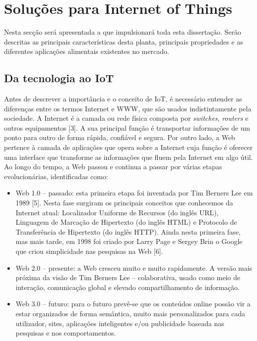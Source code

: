 
\chapter{Soluções para Internet of Things}

Nesta secção será apresentada a \sr que impulsionará toda esta dissertação. Serão descritas as principais características desta planta, principais propriedades e as diferentes aplicações alimentais existentes no mercado. 

	

\section{Da tecnologia ao IoT}


Antes de descrever a importância e o conceito de \ac{IoT}, é necessário entender as diferenças entre os termos Internet e \ac{WWW}, que são usados indistintamente pela sociedade. A Internet é a camada ou rede física composta por \textit{switches}, \textit{routers} e outros equipamentos [3]. A sua principal função é transportar informações de um ponto para outro de forma rápida, confiável e segura. Por outro lado, a Web pertence à camada de aplicações que opera sobre a Internet cuja função é oferecer uma interface que transforme as informações que fluem pela Internet em algo útil. Ao longo do tempo, a Web passou e continua a passar por várias etapas evolucionárias, identificadas como:

\begin{itemize}
	\item Web 1.0 – passado: esta primeira etapa foi inventada por Tim Berners Lee em 1989 [5]. Nesta fase surgiram os principais conceitos que conhecemos da Internet atual: Localizador Uniforme de Recursos (do inglês \ac{URL}), Linguagem de Marcação de Hipertexto (do inglês \ac{HTML}) e Protocolo de Transferência de Hipertexto (do inglês \ac{HTTP}). Ainda nesta primeira fase, mas mais tarde, em 1998 foi criado por Larry Page e Sergey Brin o Google que criou simplicidade nas pesquisas na Web [6]. 
	
	\item Web 2.0 – presente: a Web cresceu muito e muito rapidamente. A versão mais próxima da visão de Tim Berners Lee – colaborativa, usado como meio de interação, comunicação global e elevado compartilhamento de informação. 
	
	\item Web 3.0 – futuro: para o futuro prevê-se que os conteúdos online possão vir a estar organizados de forma semântica, muito mais personalizados para cada utilizador, sites, aplicações inteligentes e/ou publicidade baseada nas pesquisas e nos comportamentos.
\end{itemize}

